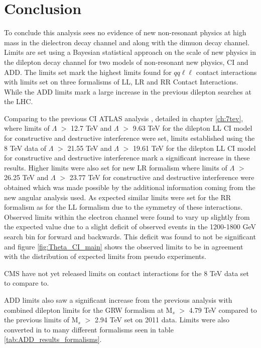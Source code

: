 \chapter{Conclusion}

To conclude this analysis sees no evidence of new non-resonant physics at high mass in the dielectron decay channel and along with the dimuon decay channel. Limits are set using a Bayesian statistical approach on the scale of new physics in the dilepton decay channel for two models of non-resonant new physics, CI and ADD. The limits set mark the highest limits found for $qq\ell\ell$ contact interactions with limits set on three formalisms of LL, LR and RR Contact Interactions. While the ADD limits mark a large increase in the previous dilepton searches at the LHC.

Comparing to the previous CI ATLAS analysis \cite{PhysRevD.87.015010}, detailed in chapter \ref{ch:7tev}, where limits of $\Lambda$ $>$ 12.7 TeV and $\Lambda$ $>$ 9.63 TeV for the dilepton LL CI model for constructive and destructive interference were set, limits established using the 8 TeV data of $\Lambda$ $>$ 21.55 TeV and $\Lambda$ $>$ 19.61 TeV for the dilepton LL CI model for constructive and destructive interference mark a significant increase in these results. Higher limits were also set for new LR formalism where limits of $\Lambda$ $>$ 26.25 TeV and $\Lambda$ $>$ 23.77 TeV for constructive and destructive interference were obtained which was made possible by the additional information coming from the new angular analysis used. As expected similar limits were set for the RR formalism as for the LL formalism due to the symmetry of these interactions. Observed limits within the electron channel were found to vary up slightly from the expected value due to a slight deficit of observed events in the 1200-1800 GeV search bin for forward and backwards. This deficit was found to not be significant and figure \ref{fig:Theta_CI_main} shows the observed limits to be in agreement with the distribution of expected limits from pseudo experiments.

CMS have not yet released limits on contact interactions for the 8 TeV data set to compare to.

ADD limits also saw a significant increase from the previous analysis \cite{PhysRevD.87.015010} with combined dilepton limits for the GRW formalism at M$_{s}$ $>$ 4.79 TeV compared to the previous limits of M$_{s}$ $>$ 2.94 TeV set on 2011 data. Limits were also converted in to many different formalisms seen in table \ref{tab:ADD_results_formalisms}. 

